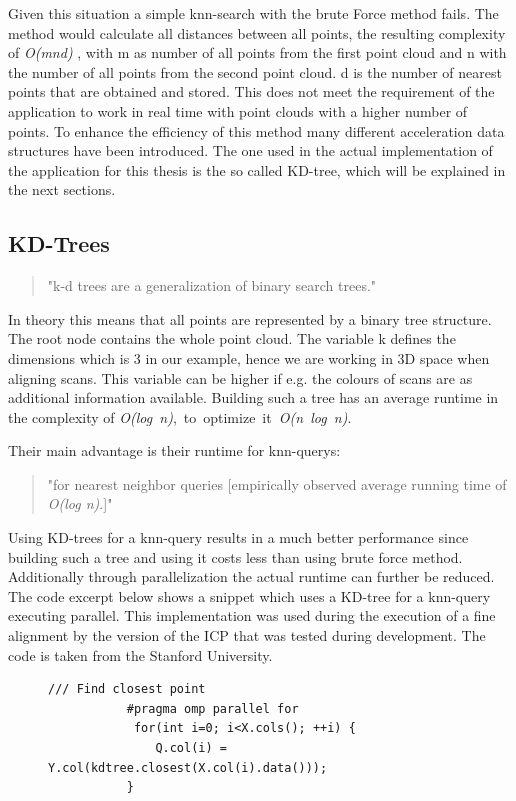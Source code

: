 \documentclass[hyperref,english,bachelorofscience,bibnum,twoside]{cgvpub}
\begin{document}
Given this situation a simple knn-search with the brute Force method fails. The method would calculate all distances between all points, the resulting complexity of  \textit{O(mnd)} \cite{Garcia2008}, with m as number of all points from the first point cloud and n with the number of all points from the second point cloud. d is the number of nearest points that are obtained and stored. This does not meet the requirement of the application to work in real time with point clouds with a higher number of points.
To enhance the efficiency of this method many different acceleration data structures have been introduced. The one used in the actual implementation of the application for this thesis is the so called KD-tree, which will be explained in the next sections.

\subsection{KD-Trees}

\begin{quote}
"k-d trees are a generalization of binary search trees."\cite{Nuchter2007}
\end{quote}
In theory this means that all points are represented by a binary tree structure. The root node contains the whole point cloud. The variable k defines the dimensions which is 3 in our example, hence we are working in 3D space when aligning scans. This variable can be higher if e.g. the colours of scans are as additional information available.
Building such a tree has an average runtime in the complexity of \mbox{\textit{O(log n)}, to optimize it \textit{O(n log n)}\cite{bentley1975}}.

Their main advantage is their runtime for knn-querys: 
\begin{quote}
"for nearest neighbor queries [empirically observed average running time of \textit{O(log n)}.]" \cite{bentley1975}
\end{quote}
Using KD-trees for a knn-query results in a much better performance since building such a tree and using it costs less than using brute force method. Additionally through parallelization the actual runtime can further be reduced. The code excerpt below shows a snippet which uses a KD-tree for a knn-query executing parallel. This implementation was used during the execution of a fine alignment by the version of the ICP that was tested during development. The code is taken from the Stanford University\cite{Bouaziz2013}.

\begin{figure}[htbp]
\begin{lstlisting}[frame=trbl]
           /// Find closest point
           #pragma omp parallel for
            for(int i=0; i<X.cols(); ++i) {
               Q.col(i) = Y.col(kdtree.closest(X.col(i).data()));
           }
\end{lstlisting}
\end{figure}
\end{document}
